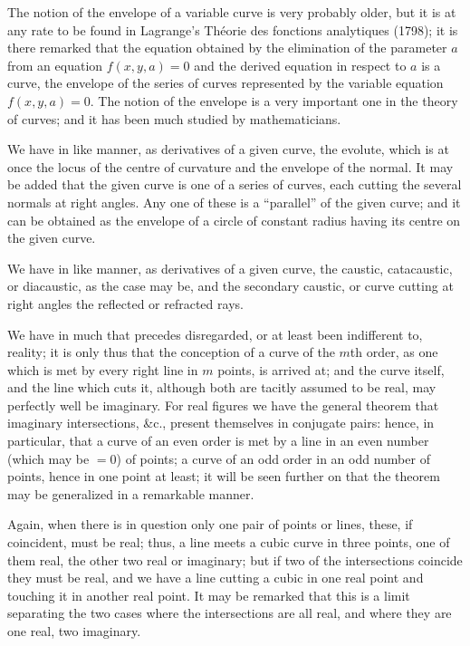\documentclass[11pt,a4paper]{article}
\begin{document}
The notion of the envelope of a variable curve is very probably older,
but it is at any rate to be found in Lagrange's Th\'{e}orie des fonctions
analytiques (1798); it is there remarked that the equation obtained by
the elimination of the parameter $a$ from an equation $f(x, y, a) = 0$
and the derived equation in respect to $a$ is a curve, the envelope of
the series of curves represented by the variable equation $f(x,y,a)=0$.
The notion of the envelope is a very important one in the theory of
curves; and it has been much studied by mathematicians.

We have in like manner, as derivatives of a given curve, the evolute,
which is at once the locus of the centre of curvature and the envelope
of the normal. It may be added that the given curve is one of a
series of curves, each cutting the several normals at right angles. Any
one of these is a ``parallel'' of the given curve; and it can be
obtained as the envelope of a circle of constant radius having its
centre on the given curve.

We have in like manner, as derivatives of a given curve, the caustic,
catacaustic, or diacaustic, as the case may be, and the secondary
caustic, or curve cutting at right angles the reflected or refracted
rays.

We have in much that precedes disregarded, or at least been indifferent
to, reality; it is only thus that the conception of a curve of the
$m$th order, as one which is met by every right line in $m$ points, is
arrived at; and the curve itself, and the line which cuts it, although
both are tacitly assumed to be real, may perfectly well be imaginary.
For real figures we have the general theorem that imaginary
intersections, \&c., present themselves in conjugate pairs: hence, in
particular, that a curve of an even order is met by a line in an even
number (which may be $=0$) of points; a curve of an odd order in an
odd number of points, hence in one point at least; it will be seen
further on that the theorem may be generalized in a remarkable manner.

Again, when there is in question only one pair of points or lines,
these, if coincident, must be real; thus, a line meets a cubic curve
in three points, one of them real, the other two real or imaginary;
but if two of the intersections coincide they must be real, and we have
a line cutting a cubic in one real point and touching it in another
real point. It may be remarked that this is a limit separating the
two cases where the intersections are all real, and where they are one
real, two imaginary.
\end{document}
